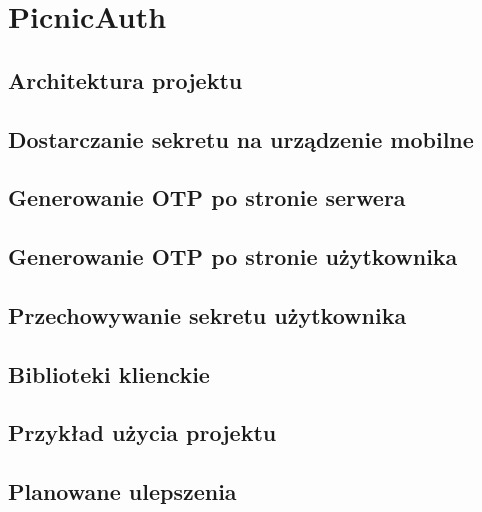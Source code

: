 \chapter{PicnicAuth}

\section{Architektura projektu}
\section{Dostarczanie sekretu na urządzenie mobilne}
\section{Generowanie OTP po stronie serwera}
\section{Generowanie OTP po stronie użytkownika}
\section{Przechowywanie sekretu użytkownika}
\section{Biblioteki klienckie}
\section{Przykład użycia projektu}
\section{Planowane ulepszenia}

